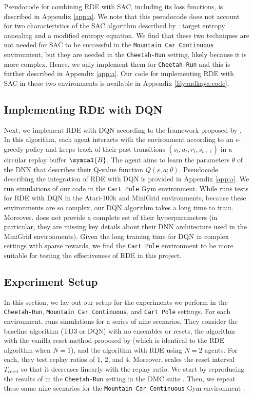\documentclass[base]{subfiles}
\begin{document}
Pseudocode for combining RDE with SAC, including its loss functions, is described in Appendix \ref{app:a}.
We note that this pseudocode does not account for two characteristics of the SAC algorithm described by \cite{sac}: target entropy annealing and a modified entropy equation.
We find that these two techniques are not needed for SAC to be successful in the \texttt{Mountain Car Continuous} environment, but they are needed in the \texttt{Cheetah-Run} setting, likely because it is more complex.
Hence, we only implement them for \texttt{Cheetah-Run} and this is further described in Appendix \ref{app:a}.
Our code for implementing RDE with SAC in these two environments is available in Appendix \ref{lilyandkaya:code}.

\subsection{Implementing RDE with DQN}

Next, we implement RDE with DQN according to the framework proposed by \cite{minh2015}.
In this algorithm, each agent interacts with the environment according to an $\epsilon$-greedy policy and keeps track of their past transitions $(s_t, a_t, r_t, s_{t+1})$ in a circular replay buffer $\symcal{B}$.
The agent aims to learn the parameters $\theta$ of the DNN that describes their Q-value function $Q(s,a;\theta)$.
Pseudocode describing the integration of RDE with DQN is provided in Appendix \ref{app:a}.
We run simulations of our code in the \texttt{Cart Pole} Gym environment.
While \cite{kim2023} runs tests for RDE with DQN in the Atari-100k and MiniGrid environments, because these environments are so complex, our DQN algorithm takes a long time to train.
Moreover, \cite{kim2023} does not provide a complete set of their hyperparameters (in particular, they are missing key details about their DNN architecture used in the MiniGrid environments).
Given the long training time for DQN in complex settings with sparse rewards, we find the \texttt{Cart Pole} environment to be more suitable for testing the effectiveness of RDE in this project.

\subsection{Experiment Setup}
\label{ssec:setup}

In this section, we lay out our setup for the experiments we perform in the \texttt{Cheetah-Run}, \texttt{Mountain Car Continuous}, and \texttt{Cart Pole} settings.
For each environment, \cite{kim2023} runs simulations for a series of nine scenarios.
They consider the baseline algorithm (TD3 or DQN) with no ensembles or resets, the algorithm with the vanilla reset method proposed by \cite{nikishin2022} (which is identical to the RDE algorithm when $N=1$), and the algorithm with RDE using $N=2$ agents.
For each, they test replay ratios of $1$, $2$, and $4$.
Moreover, \cite{kim2023} scales the reset interval $T_{reset}$ so that it decreases linearly with the replay ratio.
We start by reproducing the results of \cite{kim2023} in the \texttt{Cheetah-Run} setting in the DMC suite \cite{dmc}.
Then, we repeat these same nine scenarios for the \texttt{Mountain Car Continuous} Gym environment \cite{gym}.
\end{document}
